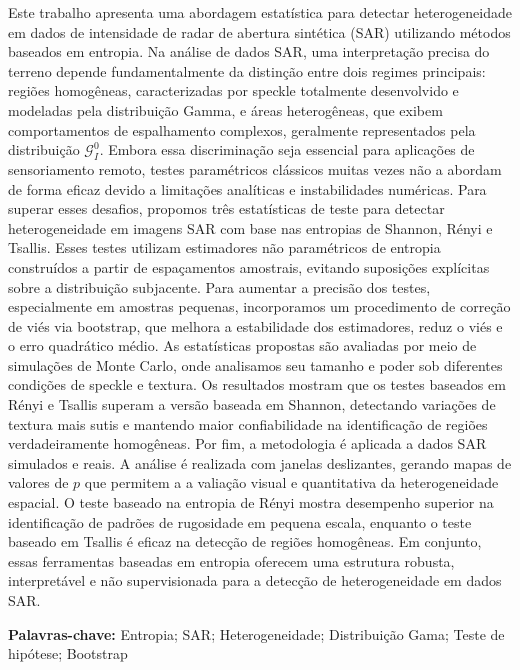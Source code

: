 

Este trabalho apresenta uma abordagem estatística para detectar heterogeneidade em dados de 
intensidade de radar de abertura sintética (SAR) utilizando métodos baseados em entropia. 
Na análise de dados SAR, uma interpretação precisa do terreno depende fundamentalmente da 
distinção entre dois regimes principais: regiões homogêneas, caracterizadas por speckle 
totalmente desenvolvido e modeladas pela distribuição Gamma, e áreas heterogêneas, que 
exibem comportamentos de espalhamento complexos, geralmente representados pela distribuição 
$\mathcal{G}_I^0$.
Embora essa discriminação seja essencial para aplicações de sensoriamento remoto, 
testes paramétricos clássicos muitas vezes não a abordam de forma eficaz devido a 
limitações analíticas e instabilidades numéricas.
Para superar esses desafios, propomos três estatísticas de teste para detectar heterogeneidade 
em imagens SAR com base nas entropias de Shannon, Rényi e Tsallis. Esses testes utilizam 
estimadores não paramétricos de entropia construídos a partir de espaçamentos amostrais, 
evitando suposições explícitas sobre a distribuição subjacente. Para aumentar a precisão dos testes, 
especialmente em amostras pequenas, incorporamos um procedimento de correção de viés via bootstrap, 
que melhora a estabilidade dos estimadores, reduz o viés e o erro quadrático médio.
As estatísticas propostas são avaliadas por meio de simulações de Monte Carlo, 
onde analisamos seu tamanho e poder sob diferentes condições de speckle e textura. 
Os resultados mostram que os testes baseados em Rényi e Tsallis superam a versão baseada 
em Shannon, detectando variações de textura mais sutis e mantendo maior confiabilidade na 
identificação de regiões verdadeiramente homogêneas.
Por fim, a metodologia é aplicada a dados SAR simulados e reais. 
A análise é realizada com janelas deslizantes, gerando mapas de valores de $p$ que permitem a a
valiação visual e quantitativa da heterogeneidade espacial. O teste baseado na entropia de 
Rényi mostra desempenho superior na identificação de padrões de rugosidade em pequena escala, 
enquanto o teste baseado em Tsallis é eficaz na detecção de regiões homogêneas. Em conjunto, 
essas ferramentas baseadas em entropia oferecem uma estrutura robusta, interpretável e não 
supervisionada para a detecção de heterogeneidade em dados SAR.

\vspace{1em}
\par
\noindent \textbf{Palavras-chave:} Entropia; SAR; Heterogeneidade; Distribuição Gama; Teste de hipótese; Bootstrap